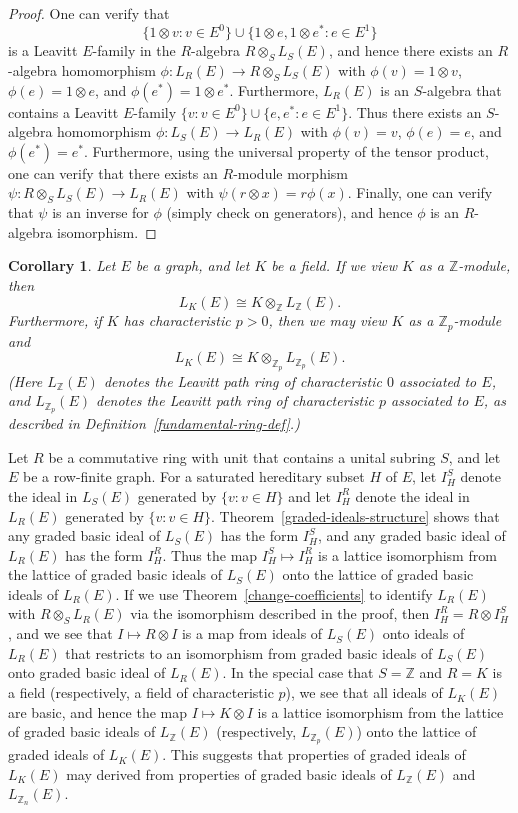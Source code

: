 \documentclass[11pt]{amsart}
\newtheorem{corollary}[theorem]{Corollary}
\theoremstyle{remark}
\numberwithin{equation}{section}
\newcommand{\Z}{\mathbb{Z}}
\begin{document}
\begin{proof}
One can verify that $$\{ 1 \otimes v : v \in E^0 \} \cup \{ 1 \otimes e, 1 \otimes e^* : e \in E^1 \}$$ is a Leavitt $E$-family in the $R$-algebra $R \otimes_S L_S(E)$, and hence there exists an $R$-algebra homomorphism $\phi : L_R(E) \to R \otimes_S L_S(E)$ with $\phi(v) = 1\otimes v$, $\phi(e) = 1 \otimes e$, and $\phi(e^*) = 1 \otimes e^*$.  Furthermore, $L_R(E)$ is an $S$-algebra that contains a Leavitt $E$-family $\{v : v \in E^0 \} \cup \{ e, e^* : e \in E^1 \}$.  Thus there exists an $S$-algebra homomorphism $\phi : L_S(E) \to L_R(E)$ with $\phi(v) = v$, $\phi(e)=e$, and $\phi(e^*) = e^*$.  Furthermore, using the universal property of the tensor product, one can verify that there exists an $R$-module morphism $\psi : R \otimes_S L_S(E) \to L_R(E)$ with $\psi (r \otimes x) = r \phi(x)$.  Finally, one can verify that $\psi$ is an inverse for $\phi$ (simply check on generators), and hence $\phi$ is an $R$-algebra isomorphism. 
\end{proof}


\begin{corollary} \label{fund-ring-K-lem}
Let $E$ be a graph, and let $K$ be a field.  If we view $K$ as a $\Z$-module, then $$L_K(E) \cong K \otimes_\Z L_{\Z} (E).$$ Furthermore, if $K$ has characteristic $p > 0$, then we may view $K$ as a $\Z_p$-module and $$L_K(E) \cong K \otimes_{\Z_p} L_{\Z_p} (E).$$
(Here $L_\Z(E)$ denotes the Leavitt path ring of characteristic $0$ associated to $E$, and $L_{\Z_p} (E)$ denotes the Leavitt path ring of characteristic $p$ associated to $E$, as described in Definition~\ref{fundamental-ring-def}.)
\end{corollary}


Let $R$ be a commutative ring with unit that contains a unital subring $S$, and let $E$ be a row-finite graph.  For a saturated hereditary subset $H$ of $E$, let $I_H^S$ denote the ideal in $L_S(E)$ generated by $\{ v : v \in H \}$ and let $I_H^R$ denote the ideal in $L_R(E)$ generated by $\{ v : v \in H \}$.  Theorem~\ref{graded-ideals-structure} shows that any graded basic ideal of $L_S(E)$ has the form $I_H^S$, and any graded basic ideal of $L_R(E)$ has the form $I_H^R$.  Thus the map $I_H^S \mapsto I_H^R$ is a lattice isomorphism from the lattice of graded basic ideals of $L_S(E)$ onto the lattice of graded basic ideals of $L_R(E)$.  If we use Theorem~\ref{change-coefficients} to identify $L_R(E)$ with $R \otimes_S L_R(E)$ via the isomorphism described in the proof, then $I_H^R = R \otimes I_H^S$, and we see that $I \mapsto R \otimes I$ is a map from ideals of $L_S(E)$ onto ideals of $L_R(E)$ that restricts to an isomorphism from graded basic ideals of $L_S(E)$ onto graded basic ideal of $L_R(E)$.  In the special case that $S = \Z$ and $R = K$ is a field (respectively, a field of characteristic $p$), we see that all ideals of $L_K(E)$ are basic, and hence the map $I \mapsto K \otimes I$ is a lattice isomorphism from the lattice of graded basic ideals of $L_\Z(E)$ (respectively, $L_{\Z_p}(E)$) onto the lattice of graded ideals of $L_K(E)$.  This suggests that properties of graded ideals of $L_K(E)$ may derived from properties of graded basic ideals of $L_\Z(E)$ and $L_{\Z_n}(E)$.  
\end{document}

